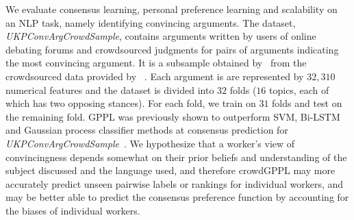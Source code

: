 We evaluate consensus learning, personal preference learning and scalability
on an NLP task, namely identifying convincing arguments. 
The dataset, \emph{UKPConvArgCrowdSample}, 
contains arguments written by users
of online debating forums
and crowdsourced judgments for pairs of arguments
 indicating the most convincing argument.
It is a subsample obtained by~\citet{simpson2018finding}
from the crowdsourced data provided by ~\citet{habernal2016argument}.
Each argument is are represented by $32,310$ numerical features and the
dataset is divided into $32$ folds ($16$ topics, each of which has two opposing stances). For each fold, we train on $31$ folds and test on the remaining fold.
GPPL was previously shown to outperform SVM, Bi-LSTM and 
Gaussian process classifier methods at consensus prediction for \emph{UKPConvArgCrowdSample}~\citep{simpson2018finding}. 
We hypothesize that a worker's view of convincingness 
depends somewhat on their prior beliefs and understanding of the subject 
discussed and the language used, and therefore
crowdGPPL may more accurately predict unseen 
pairwise labels or rankings for individual workers,
and may be better able to predict the consensus preference function by accounting 
for the biases of individual workers.

